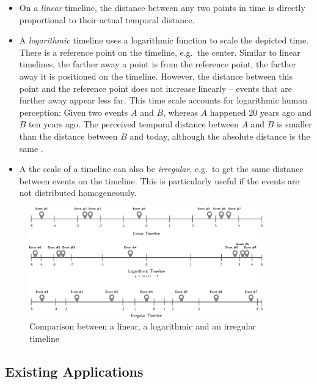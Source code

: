 \begin{itemize}
  \item On a \emph{linear} timeline, the distance between any two points in time is directly proportional to their actual temporal distance.
  \item A \emph{logarithmic} timeline uses a logarithmic function to scale the depicted time. There is a reference point on the timeline, e.g.\ the center. Similar to linear timelines, the farther away a point is from the reference point, the farther away it is positioned on the timeline. However, the distance between this point and the reference point does not increase linearly -- events that are further away appear less far. This time scale accounts for logarithmic human perception: Given two events $A$ and $B$, whereas $A$ happened 20 years ago and $B$ ten years ago. The perceived temporal distance between $A$ and $B$ is smaller than the distance between $B$ and today, although the absolute distance is the same
  \cite{logorlinear}.
  \item A the scale of a timeline can also be \emph{irregular}, e.g.\ to get the same distance between events on the timeline. This is particularly useful if the events are not distributed homogeneously.
\end{itemize}

\begin{figure}[ht]
  \centering
  \includegraphics[width=0.9\textwidth]{graphics/basics/hgis/timelines}
  \caption{Comparison between a linear, a logarithmic and an irregular timeline}
  \label{fig:timelines}
\end{figure}


\subsection{Existing Applications} %
\label{sub:applications}

